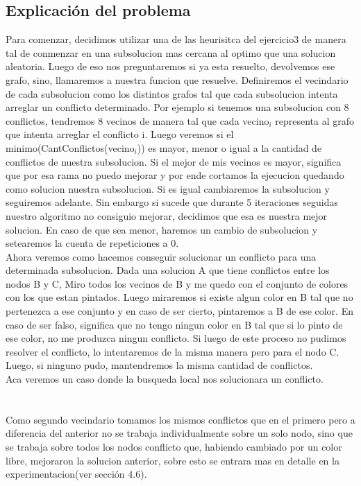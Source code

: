 \subsection{Explicaci\'on del problema}
Para comenzar, decidimos utilizar una de las heurisitca del ejercicio3 de manera tal de conmenzar en una subsolucion mas cercana al optimo que una solucion aleatoria. Luego de eso nos preguntaremos si ya esta resuelto, devolvemos ese grafo, sino, llamaremos a nuestra funcion que resuelve. Definiremos el vecindario de cada subsolucion como los distintos grafos tal que cada subsolucion intenta arreglar un conflicto determinado. Por ejemplo si tenemos una subsolucion con 8 conflictos, tendremos 8 vecinos de manera tal que cada vecino$_{i}$ representa al grafo que intenta arreglar el conflicto i. Luego veremos si el minimo(CantConflictos(vecino$_{i}$)) es mayor, menor o igual a la cantidad de conflictos de nuestra subsolucion. Si el mejor de mis vecinos es mayor, significa que por esa rama no puedo mejorar y por ende cortamos la ejecucion quedando como solucion nuestra subsolucion. Si es igual cambiaremos la subsolucion y seguiremos adelante. Sin embargo si sucede que durante 5 iteraciones seguidas nuestro algoritmo no consiguio mejorar, decidimos que esa es nuestra mejor solucion. En caso de que sea menor, haremos un cambio de subsolucion y setearemos la cuenta de repeticiones a 0.\\
Ahora veremos como hacemos conseguir solucionar un conflicto para una determinada subsolucion. Dada una solucion A que tiene conflictos entre los nodos B y C, Miro todos los vecinos de B y me quedo con el conjunto de colores con los que estan pintados. Luego miraremos si existe algun color en B tal que no pertenezca a ese conjunto y en caso de ser cierto, pintaremos a B de ese color. En caso de ser falso, significa que no tengo ningun color en B tal que si lo pinto de ese color, no me produzca ningun conflicto. Si luego de este proceso no pudimos resolver el conflicto, lo intentaremos de la misma manera pero para el nodo C. Luego, si ninguno pudo, mantendremos la misma cantidad de conflictos.\\
Aca veremos un caso donde la busqueda local nos solucionara un conflicto.\\
\\
\\
Como segundo vecindario tomamos los mismos conflictos que en el primero pero a diferencia del anterior no se trabaja individualmente sobre un solo nodo, sino que se trabaja sobre todos los nodos conflicto que, habiendo cambiado por un color libre, mejoraron la solucion anterior, sobre esto se entrara mas en detalle en la experimentacion(ver secci\'on 4.6).
